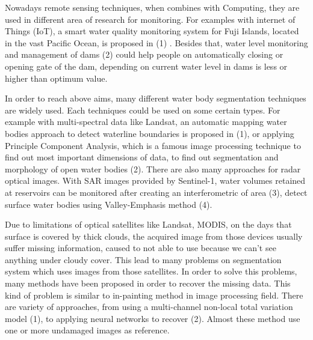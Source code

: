 Nowadays remote sensing techniques, when combines with Computing, they are used in different area of research for monitoring. For examples with internet of Things (IoT), a smart water quality monitoring system for Fuji Islands, located in the vast Pacific Ocean, is proposed in (1) . Besides that, water level monitoring and management of dams (2) could help people on automatically closing or opening gate of the dam, depending on current water level in dams is less or higher than optimum value.




In order to reach above aims, many different water body segmentation techniques are widely used. Each techniques could be used on some certain types. For example with multi-spectral data like Landsat, an automatic mapping water bodies approach to detect waterline boundaries is proposed in (1), or applying Principle Component Analysis, which is a famous image processing technique to find out most important dimensions of data, to find out segmentation and morphology of open water bodies (2). There are also many approaches for radar optical images. With SAR images provided by Sentinel-1, water volumes retained at reservoirs can be monitored after creating an interferometric of area (3), detect surface water bodies using Valley-Emphasis method (4).



Due to limitations of optical satellites like Landsat, MODIS, on the days that surface is covered by thick clouds, the acquired image from those devices usually suffer missing information, caused to not able to use because we can't see anything under cloudy cover. This lead to many problems on segmentation system which uses images from those satellites. In order to solve this problems, many methods have been proposed in order to recover the missing data. This kind of problem is similar to 
in-painting method in image processing field. There are variety of approaches, from using a multi-channel non-local total variation model (1), to applying neural networks to recover (2). Almost these method use one or more undamaged images as reference. 

